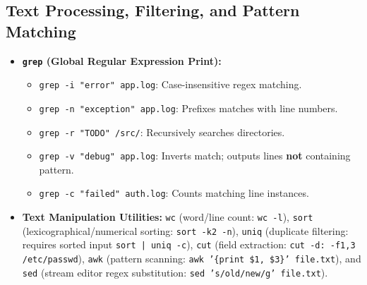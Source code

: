 \subsection{Text Processing, Filtering, and Pattern Matching}
\begin{itemize}
    \item \textbf{\texttt{grep} (Global Regular Expression Print):}
    \begin{itemize}
        \item \texttt{grep -i "error" app.log}: Case-insensitive regex matching.
        \item \texttt{grep -n "exception" app.log}: Prefixes matches with line numbers.
        \item \texttt{grep -r "TODO" /src/}: Recursively searches directories.
        \item \texttt{grep -v "debug" app.log}: Inverts match; outputs lines \textbf{not} containing pattern.
        \item \texttt{grep -c "failed" auth.log}: Counts matching line instances.
    \end{itemize}
    \item \textbf{Text Manipulation Utilities:} \texttt{wc} (word/line count: \texttt{wc -l}), \texttt{sort} (lexicographical/numerical sorting: \texttt{sort -k2 -n}), \texttt{uniq} (duplicate filtering: requires sorted input \texttt{sort | uniq -c}), \texttt{cut} (field extraction: \texttt{cut -d: -f1,3 /etc/passwd}), \texttt{awk} (pattern scanning: \texttt{awk '\{print \$1, \$3\}' file.txt}), and \texttt{sed} (stream editor regex substitution: \texttt{sed 's/old/new/g' file.txt}).
\end{itemize}

